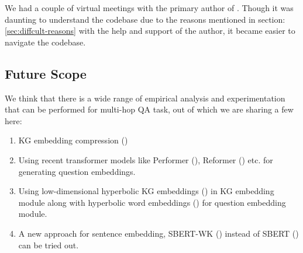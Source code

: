 We had a couple of virtual meetings with the primary author of \citep{saxena-etal-2020-improving}. Though it was daunting to understand the codebase due to the reasons mentioned in section:\ref{sec:diffcult-reasons} with the help and support of the author, it became easier to navigate the codebase. 

\subsection{Future Scope}

We think that there is a wide range of empirical analysis and experimentation that can be performed for multi-hop QA task, out of which we are sharing a few here:

\begin{enumerate}
    \item KG embedding compression (\citep{kge_compression}) 
    \item Using recent transformer models like Performer (\citep{performer}), Reformer (\citep{reformer}) etc. for generating question embeddings.
    \item Using low-dimensional hyperbolic KG embeddings (\citep{chami-etal-2020-low}) in KG embedding module along with hyperbolic word embeddings (\citep{dhingra-etal-2018-embedding}) for question embedding module.
    \item A new approach for sentence embedding, SBERT-WK (\citep{SBERT-WK}) instead of SBERT (\citep{reimers-2019-sentence-bert}) can be tried out.
\end{enumerate}
